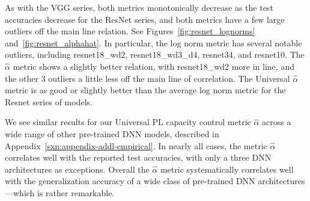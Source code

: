As with the VGG series, both metrics monotonically decrease as the test accuracies decrease for the ResNet series, and both metrics have a few large outliers off the main line relation. 
See Figures~\ref{fig:resnet_lognorms} and~\ref{fig:resnet_alphahat}.
In particular, the log norm metric has several notable outliers, including resnet18\_wd2, resnet18\_wd3\_d4, resnet34, and resnet10. 
The $\hat{\alpha}$ metric shows a slightly better relation, with resnet18\_wd2 more in line, and the other 3 outliers a little less off the main line of correlation. 
The Universal $\hat{\alpha}$ metric is as good or slightly better than the average log norm metric for the Resnet series of models. 

We see similar results for our Universal PL capacity control metric $\hat{\alpha}$ across a wide range of other pre-trained DNN models, described in Appendix~\ref{sxn:appendix-addl-empirical}.
In nearly all cases, the metric $\hat{\alpha}$ correlates well with the reported test accuracies, with only a three DNN architectures as exceptions. 
Overall the $\hat{\alpha}$ metric systematically correlates well with the generalization accuracy of a wide class of pre-trained DNN architectures---which is rather remarkable.

